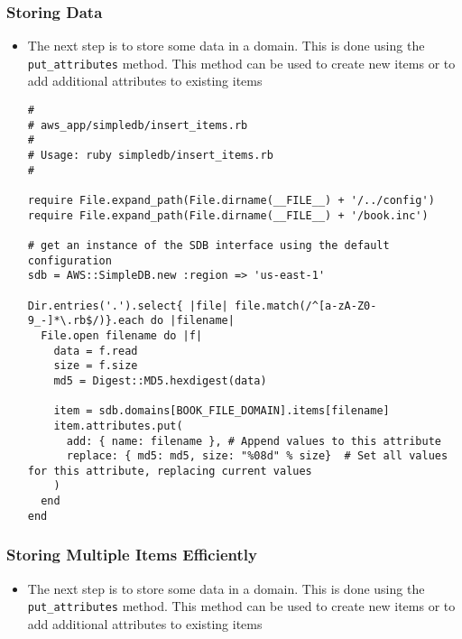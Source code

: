 \documentclass{beamer}
\begin{document}
\begin{frame}
\frametitle{Storing Data}
\begin{itemize}
\item The next step is to store some data in a domain. This is done using the
\texttt{put\_attributes} method. This method can be used to create new items or to add
additional attributes to existing items

\lstset{language=Ruby, style=eclipse}
\begin{lstlisting}[escapechar=!]
#
# aws_app/simpledb/insert_items.rb
#
# Usage: ruby simpledb/insert_items.rb
#

require File.expand_path(File.dirname(__FILE__) + '/../config')
require File.expand_path(File.dirname(__FILE__) + '/book.inc')

# get an instance of the SDB interface using the default configuration
sdb = AWS::SimpleDB.new :region => 'us-east-1'

Dir.entries('.').select{ |file| file.match(/^[a-zA-Z0-9_-]*\.rb$/)}.each do |filename|
  File.open filename do |f|
    data = f.read
    size = f.size
    md5 = Digest::MD5.hexdigest(data)

    item = sdb.domains[BOOK_FILE_DOMAIN].items[filename]
    item.attributes.put(
      add: { name: filename }, # Append values to this attribute
      replace: { md5: md5, size: "%08d" % size}  # Set all values for this attribute, replacing current values
    )
  end
end
\end{lstlisting}
\end{itemize}
\end{frame}
\begin{frame}
\frametitle{Storing Multiple Items Efficiently}
\begin{itemize}
\item The next step is to store some data in a domain. This is done using the
\texttt{put\_attributes} method. This method can be used to create new items or to add
additional attributes to existing items

\lstset{language=Ruby, style=eclipse}
\begin{lstlisting}[escapechar=!]

\end{lstlisting}
\end{itemize}
\end{frame}
\end{document}
